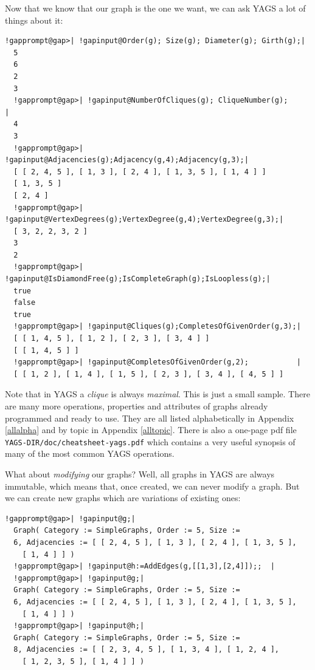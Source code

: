 \documentclass[a4paper,11pt]{report}
\begin{document}
{{Now that we know that our graph is the one we want, we can ask \textsf{YAGS} a lot of things about it: 

 
\begin{Verbatim}[commandchars=!@|,fontsize=\small,frame=single,label=Example]
  !gapprompt@gap>| !gapinput@Order(g); Size(g); Diameter(g); Girth(g);|
  5
  6
  2
  3
  !gapprompt@gap>| !gapinput@NumberOfCliques(g); CliqueNumber(g);                  |
  4
  3
  !gapprompt@gap>| !gapinput@Adjacencies(g);Adjacency(g,4);Adjacency(g,3);|
  [ [ 2, 4, 5 ], [ 1, 3 ], [ 2, 4 ], [ 1, 3, 5 ], [ 1, 4 ] ]
  [ 1, 3, 5 ]
  [ 2, 4 ]
  !gapprompt@gap>| !gapinput@VertexDegrees(g);VertexDegree(g,4);VertexDegree(g,3);|
  [ 3, 2, 2, 3, 2 ]
  3
  2
  !gapprompt@gap>| !gapinput@IsDiamondFree(g);IsCompleteGraph(g);IsLoopless(g);|
  true
  false
  true
  !gapprompt@gap>| !gapinput@Cliques(g);CompletesOfGivenOrder(g,3);|
  [ [ 1, 4, 5 ], [ 1, 2 ], [ 2, 3 ], [ 3, 4 ] ]
  [ [ 1, 4, 5 ] ]
  !gapprompt@gap>| !gapinput@CompletesOfGivenOrder(g,2);           |
  [ [ 1, 2 ], [ 1, 4 ], [ 1, 5 ], [ 2, 3 ], [ 3, 4 ], [ 4, 5 ] ]
\end{Verbatim}
 

Note that in \textsf{YAGS} a \emph{clique} is always \emph{maximal}. This is just a small sample. There are many more operations, properties and
attributes of graphs already programmed and ready to use. They are all listed
alphabetically in Appendix \ref{allalpha} and by topic in Appendix \ref{alltopic}. There is also a one-page pdf file \texttt{YAGS-DIR/doc/cheatsheet-yags.pdf} which contains a very useful synopsis of many of the most common \textsf{YAGS} operations. 

What about \emph{modifying} our graphs? Well, all graphs in \textsf{YAGS} are always immutable, which means that, once created, we can never modify a
graph. But we can create new graphs which are variations of existing ones: 

 
\begin{Verbatim}[commandchars=!@|,fontsize=\small,frame=single,label=Example]
  !gapprompt@gap>| !gapinput@g;|
  Graph( Category := SimpleGraphs, Order := 5, Size := 
  6, Adjacencies := [ [ 2, 4, 5 ], [ 1, 3 ], [ 2, 4 ], [ 1, 3, 5 ], 
    [ 1, 4 ] ] )
  !gapprompt@gap>| !gapinput@h:=AddEdges(g,[[1,3],[2,4]]);;  |
  !gapprompt@gap>| !gapinput@g;|
  Graph( Category := SimpleGraphs, Order := 5, Size := 
  6, Adjacencies := [ [ 2, 4, 5 ], [ 1, 3 ], [ 2, 4 ], [ 1, 3, 5 ], 
    [ 1, 4 ] ] )
  !gapprompt@gap>| !gapinput@h;|
  Graph( Category := SimpleGraphs, Order := 5, Size := 
  8, Adjacencies := [ [ 2, 3, 4, 5 ], [ 1, 3, 4 ], [ 1, 2, 4 ], 
    [ 1, 2, 3, 5 ], [ 1, 4 ] ] )
\end{Verbatim}
 

}}
\end{document}
